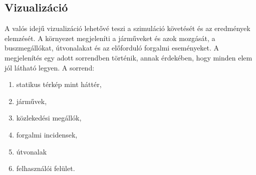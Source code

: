 \documentclass[14pt,a4paper]{extarticle}
\begin{document}
\subsection{Vizualizáció}
A valós idejű vizualizáció lehetővé teszi a szimuláció követését és az eredmények elemzését. A környezet megjeleníti a járműveket és azok mozgását, a buszmegállókat, útvonalakat és az előforduló forgalmi eseményeket.
A megjelenítés egy adott sorrendben történik, annak érdekében, hogy minden elem jól látható legyen. A sorrend:
\begin{enumerate}
    \item statikus térkép mint háttér,
    \item járművek,
    \item közlekedési megállók,
    \item forgalmi incidensek,
    \item útvonalak
    \item felhasználói felület.
\end{enumerate}
\end{document}
